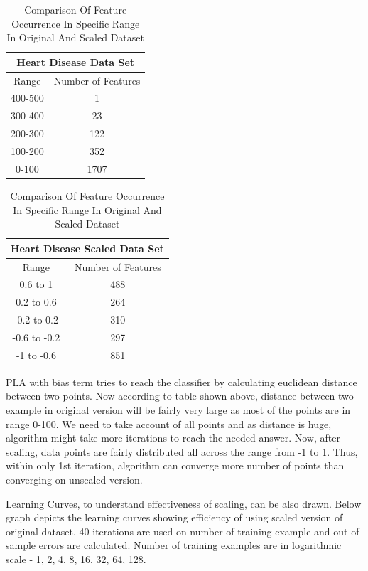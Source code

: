 \documentclass{article}
\begin{document}
\begin{table}[H]
\begin{center}
\begin{tabular}{ |c|c| } 
\hline
\multicolumn{2}{|c|}{Heart Disease Data Set } \\
\hline
Range & Number of Features\\
\hline
\hline
400-500 & 1\\
\hline
\hline
300-400 & 23\\
\hline
\hline
200-300 & 122\\
\hline
\hline
100-200 & 352\\
\hline
\hline
0-100 & 1707\\
\hline
\end{tabular}
\begin{tabular}{ |c|c| } 
\hline
\multicolumn{2}{|c|}{Heart Disease Scaled Data Set } \\
\hline
Range & Number of Features\\
\hline
\hline
0.6 to 1 & 488\\
\hline
\hline
0.2 to 0.6 & 264\\
\hline
\hline
-0.2 to 0.2 & 310\\
\hline
\hline
-0.6 to -0.2 & 297\\
\hline
\hline
-1 to -0.6 & 851\\
\hline
\end{tabular}
\caption{Comparison Of Feature Occurrence In Specific Range In Original And Scaled Dataset}
\end{center}
\end{table}
\par PLA with bias term tries to reach the classifier by calculating euclidean distance between two points. Now according to table shown above, distance between two example in original version will be fairly very large as most of the points are in range 0-100. We need to take account of all points and as distance is huge, algorithm might take more iterations to reach the needed answer. Now, after scaling, data points are fairly distributed all across the range from -1 to 1. Thus, within only 1st iteration, algorithm can converge more number of points than converging on unscaled version.
\par Learning Curves, to understand effectiveness of scaling, can be also drawn. Below graph depicts the learning curves showing efficiency of using scaled version of original dataset. 40 iterations are used on number of training example and out-of-sample errors are calculated. Number of training examples are in logarithmic scale - 1, 2, 4, 8, 16, 32, 64, 128.
\end{document}
